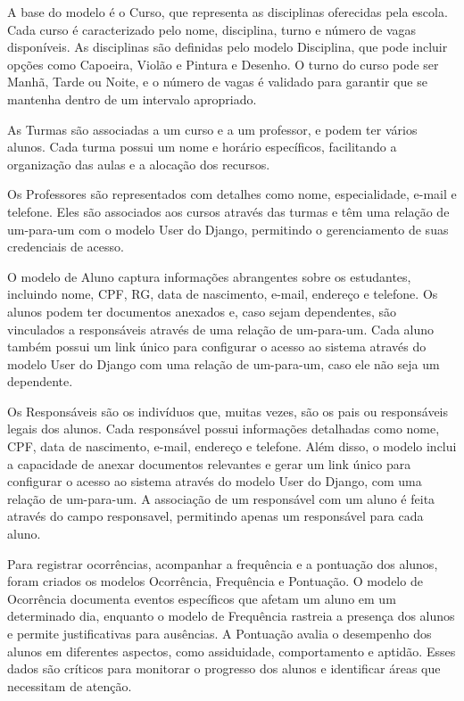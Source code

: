A base do modelo é o Curso, que representa as disciplinas oferecidas pela escola. Cada curso é caracterizado pelo nome, disciplina, turno e número de vagas disponíveis. As disciplinas são definidas pelo modelo Disciplina, que pode incluir opções como Capoeira, Violão e Pintura e Desenho. O turno do curso pode ser Manhã, Tarde ou Noite, e o número de vagas é validado para garantir que se mantenha dentro de um intervalo apropriado.

As Turmas são associadas a um curso e a um professor, e podem ter vários alunos. Cada turma possui um nome e horário específicos, facilitando a organização das aulas e a alocação dos recursos.

Os Professores são representados com detalhes como nome, especialidade, e-mail e telefone. Eles são associados aos cursos através das turmas e têm uma relação de um-para-um com o modelo User do Django, permitindo o gerenciamento de suas credenciais de acesso.

O modelo de Aluno captura informações abrangentes sobre os estudantes, incluindo nome, CPF, RG, data de nascimento, e-mail, endereço e telefone. Os alunos podem ter documentos anexados e, caso sejam dependentes, são vinculados a responsáveis através de uma relação de um-para-um. Cada aluno também possui um link único para configurar o acesso ao sistema através do modelo User do Django com uma relação de um-para-um, caso ele não seja um dependente.

Os Responsáveis são os indivíduos que, muitas vezes, são os pais ou responsáveis legais dos alunos. Cada responsável possui informações detalhadas como nome, CPF, data de nascimento, e-mail, endereço e telefone. Além disso, o modelo inclui a capacidade de anexar documentos relevantes e gerar um link único para configurar o acesso ao sistema através do modelo User do Django, com uma relação de um-para-um. A associação de um responsável com um aluno é feita através do campo responsavel, permitindo apenas um responsável para cada aluno.

Para registrar ocorrências, acompanhar a frequência e a pontuação dos alunos, foram criados os modelos Ocorrência, Frequência e Pontuação. O modelo de Ocorrência documenta eventos específicos que afetam um aluno em um determinado dia, enquanto o modelo de Frequência rastreia a presença dos alunos e permite justificativas para ausências. A Pontuação avalia o desempenho dos alunos em diferentes aspectos, como assiduidade, comportamento e aptidão. Esses dados são críticos para monitorar o progresso dos alunos e identificar áreas que necessitam de atenção.

